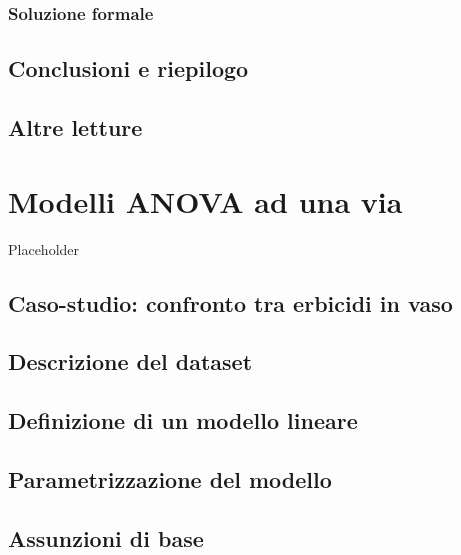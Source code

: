 \documentclass[a4paper,12pt,oneside]{book}
\begin{document}
\hypertarget{soluzione-formale-1}{%
\subsection{Soluzione formale}\label{soluzione-formale-1}}

\hypertarget{conclusioni-e-riepilogo}{%
\section{Conclusioni e riepilogo}\label{conclusioni-e-riepilogo}}

\hypertarget{altre-letture-5}{%
\section{Altre letture}\label{altre-letture-5}}

\hypertarget{modelli-anova-ad-una-via}{%
\chapter{Modelli ANOVA ad una via}\label{modelli-anova-ad-una-via}}

Placeholder

\hypertarget{caso-studio-confronto-tra-erbicidi-in-vaso}{%
\section{Caso-studio: confronto tra erbicidi in vaso}\label{caso-studio-confronto-tra-erbicidi-in-vaso}}

\hypertarget{descrizione-del-dataset}{%
\section{Descrizione del dataset}\label{descrizione-del-dataset}}

\hypertarget{definizione-di-un-modello-lineare}{%
\section{Definizione di un modello lineare}\label{definizione-di-un-modello-lineare}}

\hypertarget{parametrizzazione-del-modello}{%
\section{Parametrizzazione del modello}\label{parametrizzazione-del-modello}}

\hypertarget{assunzioni-di-base}{%
\section{Assunzioni di base}\label{assunzioni-di-base}}
\end{document}

